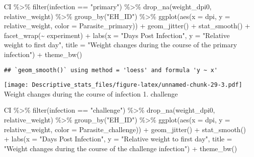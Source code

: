 \documentclass[
]{article}
\newenvironment{Shaded}{\begin{snugshade}}{\end{snugshade}}
\newcommand{\AttributeTok}[1]{\textcolor[rgb]{0.77,0.63,0.00}{#1}}
\newcommand{\FunctionTok}[1]{\textcolor[rgb]{0.00,0.00,0.00}{#1}}
\newcommand{\NormalTok}[1]{#1}
\newcommand{\SpecialCharTok}[1]{\textcolor[rgb]{0.00,0.00,0.00}{#1}}
\newcommand{\StringTok}[1]{\textcolor[rgb]{0.31,0.60,0.02}{#1}}
\begin{document}
\begin{Shaded}
\begin{Highlighting}[]
\NormalTok{CI }\SpecialCharTok{\%\textgreater{}\%} 
    \FunctionTok{filter}\NormalTok{(infection }\SpecialCharTok{==} \StringTok{"primary"}\NormalTok{) }\SpecialCharTok{\%\textgreater{}\%}
    \FunctionTok{drop\_na}\NormalTok{(weight\_dpi0, relative\_weight) }\SpecialCharTok{\%\textgreater{}\%}
    \FunctionTok{group\_by}\NormalTok{(}\StringTok{"EH\_ID"}\NormalTok{) }\SpecialCharTok{\%\textgreater{}\%}
    \FunctionTok{ggplot}\NormalTok{(}\FunctionTok{aes}\NormalTok{(}\AttributeTok{x =}\NormalTok{ dpi, }\AttributeTok{y =}\NormalTok{ relative\_weight, }\AttributeTok{color =}\NormalTok{ Parasite\_primary)) }\SpecialCharTok{+}
    \FunctionTok{geom\_jitter}\NormalTok{() }\SpecialCharTok{+}
    \FunctionTok{stat\_smooth}\NormalTok{() }\SpecialCharTok{+}
    \FunctionTok{facet\_wrap}\NormalTok{(}\SpecialCharTok{\textasciitilde{}}\NormalTok{ experiment) }\SpecialCharTok{+}
    \FunctionTok{labs}\NormalTok{(}\AttributeTok{x =} \StringTok{"Days Post Infection"}\NormalTok{, }\AttributeTok{y =} \StringTok{"Relative weight to first day"}\NormalTok{,}
         \AttributeTok{title =} \StringTok{"Weight changes during the course of the primary infection"}\NormalTok{) }\SpecialCharTok{+}
    \FunctionTok{theme\_bw}\NormalTok{()}
\end{Highlighting}
\end{Shaded}

\begin{verbatim}
## `geom_smooth()` using method = 'loess' and formula 'y ~ x'
\end{verbatim}

\texttt{[image: Descriptive\_stats\_files/figure-latex/unnamed-chunk-29-3.pdf]}
Weight changes during the course of infection 1. challenge

\begin{Shaded}
\begin{Highlighting}[]
\NormalTok{CI }\SpecialCharTok{\%\textgreater{}\%} 
    \FunctionTok{filter}\NormalTok{(infection }\SpecialCharTok{==} \StringTok{"challenge"}\NormalTok{) }\SpecialCharTok{\%\textgreater{}\%}
    \FunctionTok{drop\_na}\NormalTok{(weight\_dpi0, relative\_weight) }\SpecialCharTok{\%\textgreater{}\%}
    \FunctionTok{group\_by}\NormalTok{(}\StringTok{"EH\_ID"}\NormalTok{) }\SpecialCharTok{\%\textgreater{}\%}
    \FunctionTok{ggplot}\NormalTok{(}\FunctionTok{aes}\NormalTok{(}\AttributeTok{x =}\NormalTok{ dpi, }\AttributeTok{y =}\NormalTok{ relative\_weight, }\AttributeTok{color =}\NormalTok{ Parasite\_challenge)) }\SpecialCharTok{+}
    \FunctionTok{geom\_jitter}\NormalTok{() }\SpecialCharTok{+}
    \FunctionTok{stat\_smooth}\NormalTok{() }\SpecialCharTok{+}
    \FunctionTok{labs}\NormalTok{(}\AttributeTok{x =} \StringTok{"Days Post Infection"}\NormalTok{, }\AttributeTok{y =} \StringTok{"Relative weight to first day"}\NormalTok{,}
         \AttributeTok{title =} \StringTok{"Weight changes during the course of the challenge infection"}\NormalTok{) }\SpecialCharTok{+}
    \FunctionTok{theme\_bw}\NormalTok{()}
\end{Highlighting}
\end{Shaded}
\end{document}
